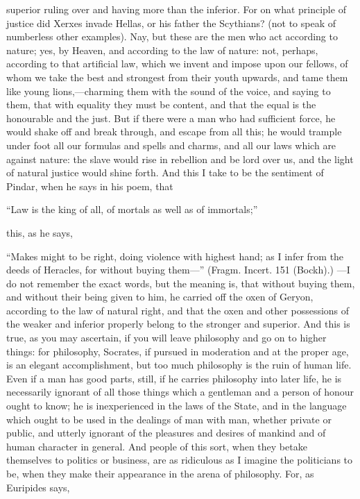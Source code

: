 \documentclass[11pt,letter]{article}
\begin{document}
superior ruling over and having more than the inferior. For on what principle of justice did Xerxes invade Hellas, or his father the Scythians? (not to speak of numberless other examples). Nay, but these are the men who act according to nature; yes, by Heaven, and according to the law of nature:  not, perhaps, according to that artificial law, which we invent and impose upon our fellows, of whom we take the best and strongest from their youth upwards, and tame them like young lions,—charming them with the sound of the voice, and saying to them, that with equality they must be content, and that the equal is the honourable and the just. But if there were a man who had sufficient force, he would shake off and break through, and escape from all this; he would trample under foot all our formulas and spells and charms, and all our laws which are against nature:  the slave would rise in rebellion and be lord over us, and the light of natural justice would shine forth. And this I take to be the sentiment of Pindar, when he says in his poem, that

\par  “Law is the king of all, of mortals as well as of immortals;”

\par  this, as he says,

\par  “Makes might to be right, doing violence with highest hand; as I infer from the deeds of Heracles, for without buying them—” (Fragm. Incert. 151 (Bockh).) —I do not remember the exact words, but the meaning is, that without buying them, and without their being given to him, he carried off the oxen of Geryon, according to the law of natural right, and that the oxen and other possessions of the weaker and inferior properly belong to the stronger and superior. And this is true, as you may ascertain, if you will leave philosophy and go on to higher things: for philosophy, Socrates, if pursued in moderation and at the proper age, is an elegant accomplishment, but too much philosophy is the ruin of human life. Even if a man has good parts, still, if he carries philosophy into later life, he is necessarily ignorant of all those things which a gentleman and a person of honour ought to know; he is inexperienced in the laws of the State, and in the language which ought to be used in the dealings of man with man, whether private or public, and utterly ignorant of the pleasures and desires of mankind and of human character in general. And people of this sort, when they betake themselves to politics or business, are as ridiculous as I imagine the politicians to be, when they make their appearance in the arena of philosophy. For, as Euripides says,
\end{document}
